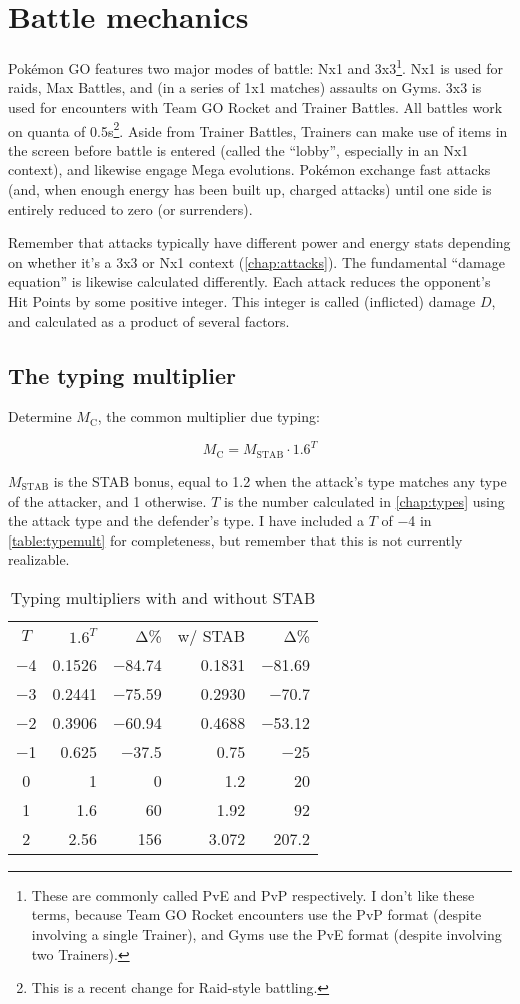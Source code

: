 \chapter{Battle mechanics\label{chap:battle}}
\nopagecolor
Pokémon GO features two major modes of battle: Nx1 and 3x3\footnote{These are commonly called PvE and PvP
 respectively. I don't like these terms, because Team GO Rocket encounters use the PvP format (despite involving
 a single Trainer), and Gyms use the PvE format (despite involving two Trainers).}.
Nx1 is used for raids, Max Battles, and (in a series of 1x1 matches) assaults on Gyms.
3x3 is used for encounters with Team GO Rocket and Trainer Battles.
All battles work on quanta of 0.5s\footnote{This is a recent change for Raid-style battling.}.
Aside from Trainer Battles, Trainers can make use of items in the screen before
  battle is entered (called the ``lobby'', especially in an Nx1 context), and
  likewise engage Mega evolutions.
Pokémon exchange fast attacks (and, when enough energy has been built up, charged attacks)
  until one side is entirely reduced to zero \HP{} (or surrenders).

Remember that attacks typically have different power and energy stats depending on
  whether it's a 3x3 or Nx1 context (\autoref{chap:attacks}).
The fundamental ``damage equation'' is likewise calculated differently.
Each attack reduces the opponent's Hit Points by some positive integer.
This integer is called (inflicted) damage $D$, and calculated as a product of several factors.

\section{The typing multiplier\label{sec:typemult}}
Determine $M_\mathrm{C}$, the common multiplier due typing:

\[ M_\mathrm{C} = M_\mathrm{STAB} \cdot 1.6^{T} \]

$M_\mathrm{STAB}$ is the STAB bonus, equal to 1.2 when the attack's type matches any
  type of the attacker, and 1 otherwise.
$T$ is the number calculated in \autoref{chap:types} using the attack type
 and the defender's type.
I have included a $T$ of −4 in \autoref{table:typemult} for completeness,
 but remember that this is not currently realizable.

\begin{table}
\centering
\begin{tabular}{c r r r r}
$T$ & $1.6^{T}$ & Δ\% & w/ STAB & Δ\% \\
\Midrule
−4 & 0.1526 & −84.74 & 0.1831 & −81.69 \\
−3 & 0.2441 & −75.59 & 0.2930 & −70.7 \\
−2 & 0.3906 & −60.94 & 0.4688 & −53.12 \\
−1 & 0.625 & −37.5 & 0.75 & −25 \\
0 & 1 & 0 & 1.2 & 20 \\
1 & 1.6 & 60 & 1.92 & 92 \\
2 & 2.56 & 156 & 3.072 & 207.2 \\
\end{tabular}
\caption{Typing multipliers with and without STAB\label{table:typemult}}
\end{table}

